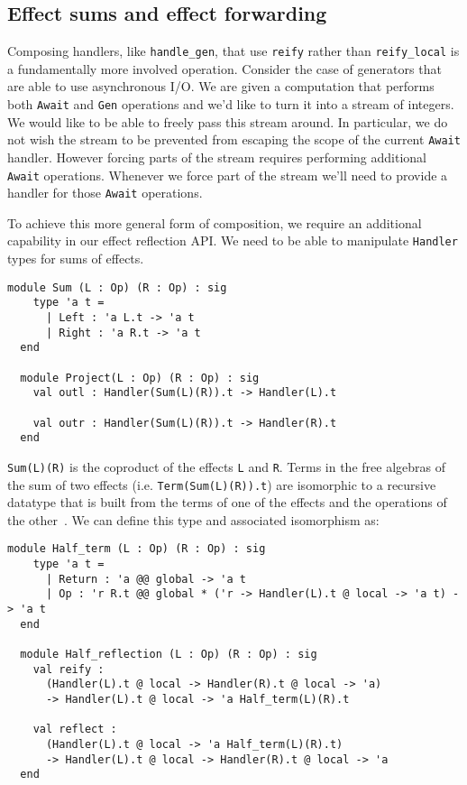 \documentclass[acmsmall, screen, review, anonymous]{acmart}
\theoremstyle{definition}
\begin{document}
\subsection{Effect sums and effect forwarding}

Composing handlers, like \lstinline[style=oxcaml]{handle_gen}, that use
\lstinline[style=oxcaml]{reify} rather than
\lstinline[style=oxcaml]{reify_local} is a fundamentally more involved
operation. Consider the case of generators that are able to use
asynchronous I/O. We are given a computation that performs both
\lstinline[style=oxcaml]{Await} and \lstinline[style=oxcaml]{Gen}
operations and we'd like to turn it into a stream of integers.  We would
like to be able to freely pass this stream around. In particular, we do
not wish the stream to be prevented from escaping the scope of the
current \lstinline[style=oxcaml]{Await} handler.  However forcing parts
of the stream requires performing additional
\lstinline[style=oxcaml]{Await} operations. Whenever we force part of the
stream we'll need to provide a handler for those
\lstinline[style=oxcaml]{Await} operations.

To achieve this more general form of composition, we require an
additional capability in our effect reflection API. We need to be able
to manipulate \lstinline[style=oxcaml]{Handler} types for sums of
effects.
\begin{lstlisting}[style=oxcaml]
  module Sum (L : Op) (R : Op) : sig
    type 'a t =
      | Left : 'a L.t -> 'a t
      | Right : 'a R.t -> 'a t
  end

  module Project(L : Op) (R : Op) : sig
    val outl : Handler(Sum(L)(R)).t -> Handler(L).t

    val outr : Handler(Sum(L)(R)).t -> Handler(R).t
  end
\end{lstlisting}

\lstinline[style=oxcaml]{Sum(L)(R)} is the coproduct of the effects
\lstinline[style=oxcaml]{L} and \lstinline[style=oxcaml]{R}. Terms in
the free algebras of the sum of two effects
(i.e. \lstinline[style=oxcaml]{Term(Sum(L)(R)).t}) are isomorphic to a
recursive datatype that is built from the terms of one of the effects
and the operations of the other~\cite{hyland2006combining}. We can define
this type and associated isomorphism as:
\begin{lstlisting}[style=oxcaml]
  module Half_term (L : Op) (R : Op) : sig
    type 'a t =
      | Return : 'a @@ global -> 'a t
      | Op : 'r R.t @@ global * ('r -> Handler(L).t @ local -> 'a t) -> 'a t
  end

  module Half_reflection (L : Op) (R : Op) : sig
    val reify :
      (Handler(L).t @ local -> Handler(R).t @ local -> 'a)
      -> Handler(L).t @ local -> 'a Half_term(L)(R).t

    val reflect :
      (Handler(L).t @ local -> 'a Half_term(L)(R).t)
      -> Handler(L).t @ local -> Handler(R).t @ local -> 'a
  end
\end{lstlisting}
\end{document}
